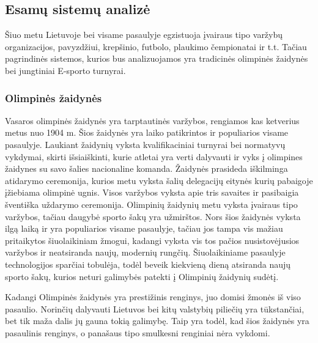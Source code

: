 \documentclass{VUMIFPSkursinis}
\begin{document}
  \subsection{Esamų sistemų analizė} \label{isorineVersloProcesoAnalize_esamuSistemuAnalize}
    Šiuo metu Lietuvoje bei visame pasaulyje egzistuoja įvairaus tipo varžybų organizacijos, pavyzdžiui, krepšinio, futbolo, plaukimo čempionatai ir t.t.
    Tačiau pagrindinės sistemos, kurios bus analizuojamos yra tradicinės olimpinės žaidynės bei jungtiniai E-sporto turnyrai.
    \subsubsection*{Olimpinės žaidynės} \label{isorineVersloProcesoAnalize_esamuSistemuAnalize_olimpines}
       \label{isorineVersloProcesoAnalize_esamuSistemuAnalize_olimpines_veikimas}
        Vasaros olimpinės žaidynės yra tarptautinės varžybos, rengiamos kas ketverius metus nuo 1904 m.  Šios žaidynės yra laiko patikrintos ir populiarios
        visame pasaulyje. Laukiant žaidynių vyksta kvalifikaciniai turnyrai bei normatyvų vykdymai,  skirti išsiaiškinti, kurie atletai yra verti dalyvauti ir
        vyks į olimpines žaidynes su savo šalies nacionaline komanda. Žaidynės prasideda iškilminga atidarymo ceremonija, kurios metu vyksta šalių delegacijų
        eitynės  kurių pabaigoje įžiebiama olimpinė ugnis. Visos varžybos vyksta apie tris savaites ir pasibaigia šventiška uždarymo ceremonija.
       \label{isorineVersloProcesoAnalize_esamuSistemuAnalize_olimpines_trukumai}
        Olimpinių žaidynių metu vyksta įvairaus tipo varžybos, tačiau daugybė sporto šakų yra užmirštos. Nors šios žaidynės vyksta ilgą laiką ir yra
        populiarios visame pasaulyje, tačiau jos tampa vis mažiau pritaikytos šiuolaikiniam žmogui, kadangi vyksta vis tos pačios nusistovėjusios varžybos ir
        neatsiranda naujų, modernių rungčių. Šiuolaikiniame pasaulyje technologijos sparčiai tobulėja, todėl beveik kiekvieną dieną atsiranda naujų sporto šakų,
        kurios neturi galimybės patekti į Olimpinių žaidynių sudėtį.

        Kadangi Olimpinės žaidynės yra prestižinis renginys, juo domisi žmonės iš viso pasaulio. Norinčių dalyvauti Lietuvos bei kitų valstybių piliečių yra
        tūkstančiai, bet tik maža dalis jų gauna tokią galimybę. Taip yra todėl, kad šios žaidynės yra pasaulinis renginys, o panašaus tipo smulkesni renginiai
        nėra vykdomi. 
\end{document}
